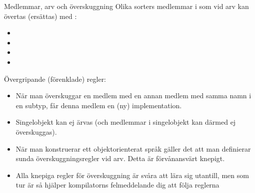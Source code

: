 



\begin{Slide}{Medlemmar, arv och överskuggning}\SlideFontTiny
\noindent Olika sorters medlemmar i  som vid arv kan övertas (ersättas) med :
\begin{itemize}
\item {}
\item {}
\item {}
\item {}
\end{itemize}




\pause

Övergripande (förenklade) regler:

\begin{itemize}\SlideFontTiny
\item När man överskuggar  en medlem med en annan medlem med samma namn i en subtyp, får denna medlem en (ny) implementation.

\item Singelobjekt kan ej ärvas (och medlemmar i singelobjekt kan därmed ej överskuggas).

\item När man konstruerar ett objektorienterat språk gäller det att man definierar sunda överskuggningsregler vid arv. Detta är förvånansvärt knepigt.

\item Alla knepiga regler för överskuggning är svåra att lära sig utantill, men som tur är så hjälper kompilatorns felmeddelande dig att följa reglerna \code{:)}
\end{itemize}
\end{Slide}


